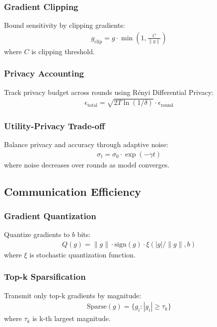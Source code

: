 \documentclass[journal]{IEEEtran}
\begin{document}
\subsubsection{Gradient Clipping}
Bound sensitivity by clipping gradients:
\begin{align}
g_{\text{clip}} = g \cdot \min\left(1, \frac{C}{\|g\|}\right)
\end{align}
where $C$ is clipping threshold.

\subsubsection{Privacy Accounting}
Track privacy budget across rounds using Rényi Differential Privacy:
\begin{align}
\epsilon_{\text{total}} = \sqrt{2T\ln(1/\delta)} \cdot \epsilon_{\text{round}}
\end{align}

\subsubsection{Utility-Privacy Trade-off}
Balance privacy and accuracy through adaptive noise:
\begin{align}
\sigma_t = \sigma_0 \cdot \exp(-\gamma t)
\end{align}
where noise decreases over rounds as model converges.

\subsection{Communication Efficiency}

\subsubsection{Gradient Quantization}
Quantize gradients to $b$ bits:
\begin{align}
Q(g) = \|g\| \cdot \text{sign}(g) \cdot \xi(|g|/\|g\|, b)
\end{align}
where $\xi$ is stochastic quantization function.

\subsubsection{Top-k Sparsification}
Transmit only top-k gradients by magnitude:
\begin{align}
\text{Sparse}(g) = \{g_i : |g_i| \geq \tau_k\}
\end{align}
where $\tau_k$ is k-th largest magnitude.
\end{document}
